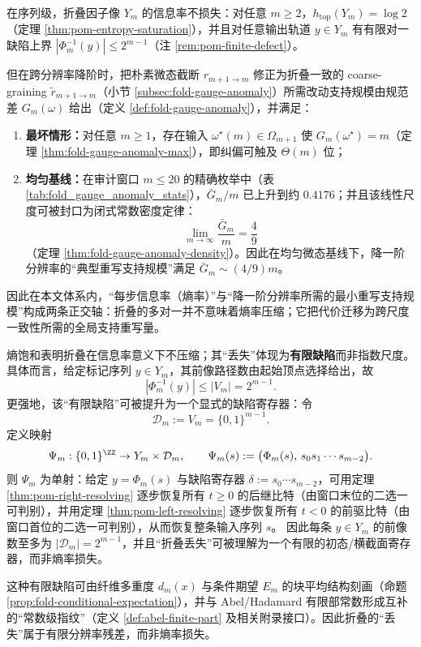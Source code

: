 \begin{corollary}\label{cor:pom-two-axis-separation}
在序列级，折叠因子像 \(Y_m\) 的信息率不损失：对任意 \(m\ge 2\)，\(h_{\mathrm{top}}(Y_m)=\log 2\)（定理 \ref{thm:pom-entropy-saturation}），并且对任意输出轨道 \(y\in Y_m\) 有有限对一缺陷上界 \( |\Phi_m^{-1}(y)|\le 2^{m-1}\)（注 \ref{rem:pom-finite-defect}）。
\par
但在跨分辨率降阶时，把朴素微态截断 \(r_{m+1\to m}\) 修正为折叠一致的 coarse-graining \(\widetilde r_{m+1\to m}\)（小节 \ref{subsec:fold-gauge-anomaly}）所需改动支持规模由规范差 \(G_m(\omega)\) 给出（定义 \ref{def:fold-gauge-anomaly}），并满足：
\begin{enumerate}
  \item \textbf{最坏情形：}对任意 \(m\ge 1\)，存在输入 \(\omega^\star(m)\in\Omega_{m+1}\) 使 \(G_m(\omega^\star)=m\)（定理 \ref{thm:fold-gauge-anomaly-max}），即纠偏可触及 \(\Theta(m)\) 位；
  \item \textbf{均匀基线：}在审计窗口 \(m\le 20\) 的精确枚举中（表 \ref{tab:fold_gauge_anomaly_stats}），\(\bar G_m/m\) 已上升到约 \(0.4176\)；并且该线性尺度可被封口为闭式常数密度定律：
  \[
  \lim_{m\to\infty}\frac{\bar G_m}{m}=\frac{4}{9}
  \]
  （定理 \ref{thm:fold-gauge-anomaly-density}）。因此在均匀微态基线下，降一阶分辨率的“典型重写支持规模”满足 \(\bar G_m\sim (4/9)m\)。
\end{enumerate}
因此在本文体系内，“每步信息率（熵率）”与“降一阶分辨率所需的最小重写支持规模”构成两条正交轴：折叠的多对一并不意味着熵率压缩；它把代价迁移为跨尺度一致性所需的全局支持重写量。
\end{corollary}

\begin{remark}\label{rem:pom-finite-defect}
熵饱和表明折叠在信息率意义下不压缩；其“丢失”体现为\textbf{有限缺陷}而非指数尺度。具体而言，给定标记序列 $y\in Y_m$，其前像路径数由起始顶点选择给出，故
\[
|\Phi_m^{-1}(y)|\le |V_m|=2^{m-1}.
\]
更强地，该“有限缺陷”可被提升为一个显式的缺陷寄存器：令
\[
\mathcal{D}_m:=V_m=\{0,1\}^{m-1}.
\]
定义映射
\[
\Psi_m:\{0,1\}^{\ZZ}\to Y_m\times \mathcal{D}_m,\qquad
\Psi_m(s):=\bigl(\Phi_m(s),\,s_0s_1\cdots s_{m-2}\bigr).
\]
则 $\Psi_m$ 为单射：给定 $y=\Phi_m(s)$ 与缺陷寄存器 $\delta:=s_0\cdots s_{m-2}$，可用定理 \ref{thm:pom-right-resolving} 逐步恢复所有 $t\ge 0$ 的后继比特（由窗口末位的二选一可判别），并用定理 \ref{thm:pom-left-resolving} 逐步恢复所有 $t<0$ 的前驱比特（由窗口首位的二选一可判别），从而恢复整条输入序列 $s$。
因此每条 $y\in Y_m$ 的前像数至多为 $|\mathcal{D}_m|=2^{m-1}$，并且“折叠丢失”可被理解为一个有限的初态/横截面寄存器，而非熵率损失。

这种有限缺陷可由纤维多重度 $d_m(x)$ 与条件期望 $E_m$ 的块平均结构刻画（命题 \ref{prop:fold-conditional-expectation}），并与 Abel/Hadamard 有限部常数形成互补的“常数级指纹”（定义 \ref{def:abel-finite-part} 及相关附录接口）。因此折叠的“丢失”属于有限分辨率残差，而非熵率损失。
\end{remark}

